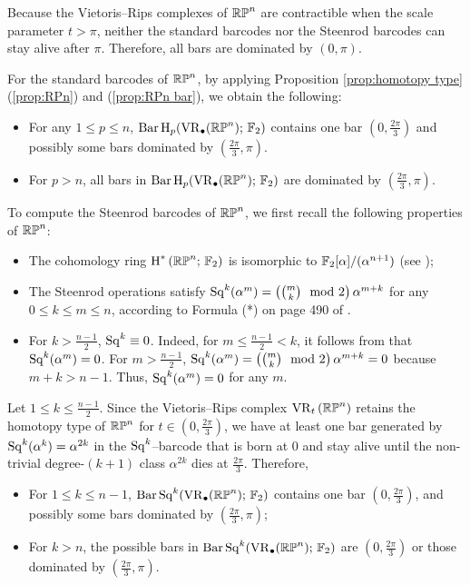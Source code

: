 Because the Vietoris--Rips complexes of $\mathbb{RP}^n$ are contractible when the scale parameter $t>\pi$, neither the standard barcodes nor the Steenrod barcodes can stay alive after $\pi$. Therefore, all bars are dominated by $(0,\pi)$.

For the standard barcodes of $\mathbb{RP}^n$, by applying Proposition \ref{prop:homotopy type} (\ref{prop:RPn}) and (\ref{prop:RPn bar}), %
we obtain the following:
\begin{itemize}
	\item For any $1\leq p\leq n$, $\operatorname{Bar} \operatorname{H}_{p}(\operatorname{VR}_\bullet(\mathbb{RP}^n);\,{\mathbb{F}_2})$ contains one bar $\left(0,\frac{2\pi}{3}\right)$ and possibly some bars  dominated by $\left(\frac{2\pi}{3},\pi\right)$.
	\item For $p>n$, all bars in $\operatorname{Bar} \operatorname{H}_{p}(\operatorname{VR}_\bullet(\mathbb{RP}^n);\,{\mathbb{F}_2})$ are dominated by $\left(\frac{2\pi}{3},\pi\right)$.
\end{itemize}

To compute the Steenrod barcodes of $\mathbb{RP}^n$, we first recall the following properties of $\mathbb{RP}^n$:
\begin{itemize}
	\item The cohomology ring $\operatorname{H}^*\left(\mathbb{RP}^n;\,{\mathbb{F}_2}\right)$ is isomorphic to ${\mathbb{F}_2}[\alpha]/(\alpha^{n+1})$ (see \cite[Theorem 3.19]{hatcher2000});
	\item The Steenrod operations satisfy $\operatorname{Sq}^k(\alpha^m)=\left({m \choose k} \mod 2\right)\alpha^{m+k}$ for any $0\leq k\leq m\leq n$, according to Formula (*) on page 490 of \cite{hatcher2000}.
	\item For $k>\frac{n-1}{2}$, $\operatorname{Sq}^k\equiv 0$. Indeed, for $m\leq \frac{n-1}{2}<k$, it follows from \cite[page 489, Item (5)]{hatcher2000} that $\operatorname{Sq}^k(\alpha^m)=0$. For $m> \frac{n-1}{2}$, $\operatorname{Sq}^k(\alpha^m)=\left({m \choose k} \mod 2\right)\alpha^{m+k}=0$ because $m+k>n-1.$ Thus, $\operatorname{Sq}^k(\alpha^m)=0$ for any $m$.
\end{itemize}
Let $1\leq k\leq \frac{n-1}{2}$. Since the Vietoris--Rips complex $\operatorname{VR}_t\left(\mathbb{RP}^n\right)$ retains the homotopy type of $\mathbb{RP}^n$ for $t\in \left(0,\frac{2\pi}{3}\right)$, we have at least one bar generated by $\operatorname{Sq}^k(\alpha^k)=\alpha^{2k}$ in the $\operatorname{Sq}^k$--barcode that is born at $0$ and stay alive until the non-trivial degree-$(k+1)$ class $\alpha^{2k}$ dies at $\frac{2\pi}{3}$. Therefore,
\begin{itemize}
	\item For $1\leq k\leq n-1$, $\operatorname{Bar}\operatorname{Sq}^{k}(\operatorname{VR}_\bullet(\mathbb{RP}^n);\,{\mathbb{F}_2})$ contains one bar $\left(0,\frac{2\pi}{3}\right)$, and possibly some bars dominated by $\left(\frac{2\pi}{3},\pi\right)$;
	\item For $k>n$, the possible bars in $\operatorname{Bar}\operatorname{Sq}^{k}(\operatorname{VR}_\bullet(\mathbb{RP}^n);\,{\mathbb{F}_2})$ are $\left(0,\frac{2\pi}{3}\right)$ or those dominated by $\left(\frac{2\pi}{3},\pi\right)$.
\end{itemize}


